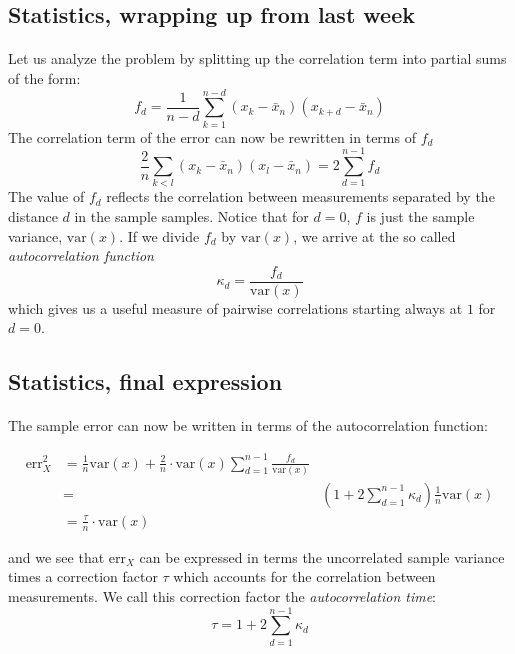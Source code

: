 \noindent

    

\subsection*{Statistics, wrapping up from last week}

\paragraph{}
Let us analyze the problem by splitting up the correlation term into
partial sums of the form:
\[
f_d = \frac{1}{n-d}\sum_{k=1}^{n-d}(x_k - \bar x_n)(x_{k+d} - \bar x_n)
\]
The correlation term of the error can now be rewritten in terms of
$f_d$
\[
\frac{2}{n}\sum_{k<l} (x_k - \bar x_n)(x_l - \bar x_n) =
2\sum_{d=1}^{n-1} f_d
\]
The value of $f_d$ reflects the correlation between measurements
separated by the distance $d$ in the sample samples.  Notice that for
$d=0$, $f$ is just the sample variance, $\mathrm{var}(x)$. If we divide $f_d$
by $\mathrm{var}(x)$, we arrive at the so called \emph{autocorrelation function}
\[
\kappa_d = \frac{f_d}{\mathrm{var}(x)}
\]
which gives us a useful measure of pairwise correlations
starting always at $1$ for $d=0$.



\subsection*{Statistics, final expression}

\paragraph{}
The sample error can now be
written in terms of the autocorrelation function:

\begin{align}
\mathrm{err}_X^2 &=
\frac{1}{n}\mathrm{var}(x)+\frac{2}{n}\cdot\mathrm{var}(x)\sum_{d=1}^{n-1}
\frac{f_d}{\mathrm{var}(x)}\nonumber\\ &=&
\left(1+2\sum_{d=1}^{n-1}\kappa_d\right)\frac{1}{n}\mathrm{var}(x)\nonumber\\
&=\frac{\tau}{n}\cdot\mathrm{var}(x)
\end{align}

and we see that $\mathrm{err}_X$ can be expressed in terms the
uncorrelated sample variance times a correction factor $\tau$ which
accounts for the correlation between measurements. We call this
correction factor the \emph{autocorrelation time}:
\begin{equation}
\tau = 1+2\sum_{d=1}^{n-1}\kappa_d
\label{eq:autocorrelation_time}
\end{equation}



